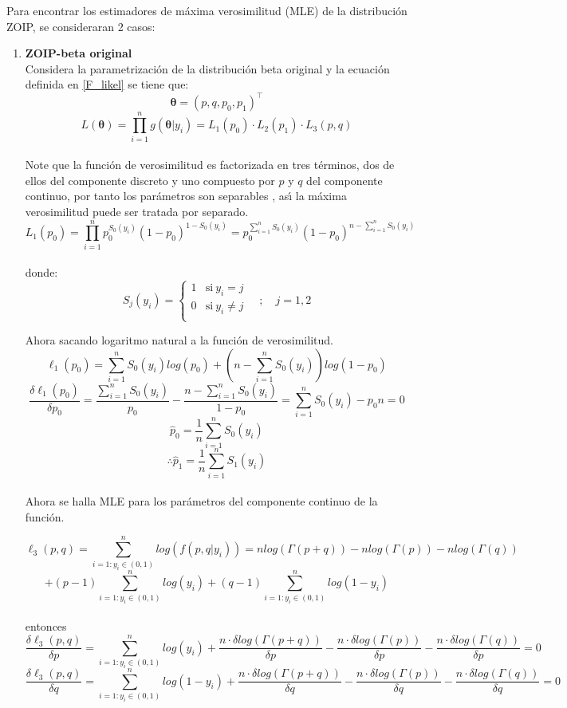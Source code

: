 Para encontrar los estimadores de m\'{a}xima verosimilitud (MLE) de la distribuci\'{o}n ZOIP, se consideraran 2 casos:

\begin{enumerate}
	\item \textbf{ZOIP-beta original}\\
	Considera la parametrizaci\'{o}n de la distribuci\'{o}n beta original y la ecuaci\'{o}n definida en \eqref{F_likel} se tiene que:
	\[
	\boldsymbol{\theta}=(p,q,p_0,p_1)^{\top}
	\]
	\[
	L(\boldsymbol{\theta})=\prod_{i=1}^{n}g(\boldsymbol{\theta}|y_i)=L_1(p_0)\cdot L_2(p_1) \cdot L_3(p,q)
	\]
	\\
Note que la funci\'{o}n de verosimilitud es factorizada en tres t\'{e}rminos, dos de ellos del componente discreto y uno compuesto por $p$ y $q$ del componente continuo, por tanto los par\'{a}metros son separables \citep{Pace1}, as\'{\i} la m\'{a}xima verosimilitud puede ser tratada por separado.\\
\[
L_1(p_0)=\prod_{i=1}^{n}p_0^{S_0(y_i)}(1-p_0)^{1-S_0(y_i)}=p_0^{\sum_{i=1}^{n}{S_0(y_i)}}(1-p_0)^{n-\sum_{i=1}^{n}{S_0(y_i)}}
\]
\\
donde:
\begin{equation}
S_j(y_i)=
\begin{cases}
1 & \text{si}\ y_i=j\\
0 & \text{si}\ y_i\neq j\\
\end{cases}
\quad ; \quad j=1,2 \label{Sj}
\end{equation}

Ahora sacando logaritmo natural a la funci\'{o}n de verosimilitud.
\[
\ell_1(p_0)=\sum_{i=1}^{n}{S_0(y_i)log(p_0)}+(n-\sum_{i=1}^{n}{S_0(y_i)})log(1-p_0)
\]	
\[
\frac{\delta \ell_1(p_0)}{\delta p_0}=\frac{\sum_{i=1}^{n}{S_0(y_i)}}{p_0}-\frac{n-\sum_{i=1}^{n}{S_0(y_i)}}{1-p_0}=\sum_{i=1}^{n}{S_0(y_i)}-p_0n=0
\]
\[
\hat{p}_0=\frac{1}{n}\sum_{i=1}^{n}{S_0(y_i)}
\]
\[
\therefore \hat{p}_1=\frac{1}{n}\sum_{i=1}^{n}{S_1(y_i)}
\]
\\
Ahora se halla MLE para los par\'{a}metros del componente continuo de la funci\'{o}n.

\[
\ell_3(p,q)=\sum_{i=1:y_i \in (0,1)}^{n}{log(f(p,q|y_i))}=n log(\Gamma(p+q))-n log(\Gamma(p))-n log(\Gamma(q))
\]
\[
+(p-1)\sum_{i=1:y_i \in (0,1)}^{n}{log(y_i)}+(q-1)\sum_{i=1:y_i \in (0,1)}^{n}{log(1-y_i)}
\]
\\
entonces
\[
\frac{\delta \ell_3(p,q)}{\delta p}=\sum_{i=1:y_i \in (0,1)}^{n}{log(y_i)}+\frac{n \cdot \delta log(\Gamma(p+q))}{\delta p}- \frac{n \cdot \delta log(\Gamma(p))}{\delta p}-\frac{n\cdot \delta log(\Gamma(q))}{\delta p}=0
\]
\[
\frac{\delta \ell_3(p,q)}{\delta q}=\sum_{i=1:y_i \in (0,1)}^{n}{log(1-y_i)}+\frac{n \cdot \delta log(\Gamma(p+q))}{\delta q}- \frac{n \cdot \delta log(\Gamma(p))}{\delta q}-\frac{n\cdot \delta log(\Gamma(q))}{\delta q}=0
\]


\end{enumerate}
